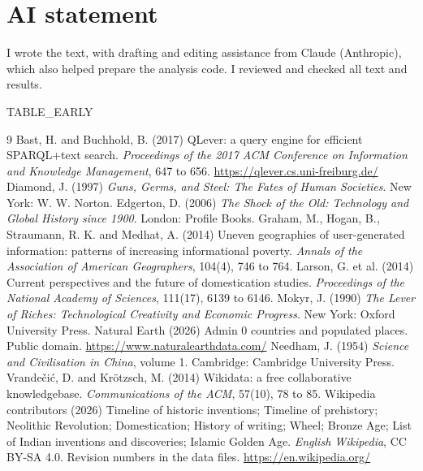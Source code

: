 \documentclass[11pt,a4paper]{article}
\begin{document}
\section*{AI statement}
I wrote the text, with drafting and editing assistance from Claude (Anthropic), which also helped prepare the analysis code. I reviewed and checked all text and results.

{{TABLE_EARLY}}

\begin{thebibliography}{9}
 Bast, H. and Buchhold, B. (2017) QLever: a query engine for efficient SPARQL+text search. \emph{Proceedings of the 2017 ACM Conference on Information and Knowledge Management}, 647 to 656. \url{https://qlever.cs.uni-freiburg.de/}
 Diamond, J. (1997) \emph{Guns, Germs, and Steel: The Fates of Human Societies}. New York: W. W. Norton.
 Edgerton, D. (2006) \emph{The Shock of the Old: Technology and Global History since 1900}. London: Profile Books.
 Graham, M., Hogan, B., Straumann, R. K. and Medhat, A. (2014) Uneven geographies of user-generated information: patterns of increasing informational poverty. \emph{Annals of the Association of American Geographers}, 104(4), 746 to 764.
 Larson, G. et al. (2014) Current perspectives and the future of domestication studies. \emph{Proceedings of the National Academy of Sciences}, 111(17), 6139 to 6146.
 Mokyr, J. (1990) \emph{The Lever of Riches: Technological Creativity and Economic Progress}. New York: Oxford University Press.
 Natural Earth (2026) Admin 0 countries and populated places. Public domain. \url{https://www.naturalearthdata.com/}
 Needham, J. (1954) \emph{Science and Civilisation in China}, volume 1. Cambridge: Cambridge University Press.
 Vrandečić, D. and Krötzsch, M. (2014) Wikidata: a free collaborative knowledgebase. \emph{Communications of the ACM}, 57(10), 78 to 85.
 Wikipedia contributors (2026) Timeline of historic inventions; Timeline of prehistory; Neolithic Revolution; Domestication; History of writing; Wheel; Bronze Age; List of Indian inventions and discoveries; Islamic Golden Age. \emph{English Wikipedia}, CC BY-SA 4.0. Revision numbers in the data files. \url{https://en.wikipedia.org/}
\end{thebibliography}
\end{document}
